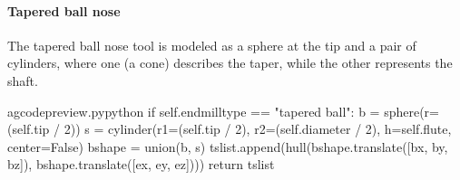 \documentclass{ltxdoc}
\begin{document}
\paragraph{Tapered ball nose}

The tapered ball nose tool is modeled as a sphere at the tip and a pair of cylinders, where one (a cone) describes the taper, while the other represents the shaft.

\lstset{firstnumber=\thegcpy}
\begin{writecode}{a}{gcodepreview.py}{python}
        if self.endmilltype == "tapered ball":
            b = sphere(r=(self.tip / 2))
            s = cylinder(r1=(self.tip / 2), r2=(self.diameter / 2), h=self.flute, center=False)
            bshape = union(b, s)
            tslist.append(hull(bshape.translate([bx, by, bz]), bshape.translate([ex, ey, ez])))
            return tslist

\end{writecode}
\addtocounter{gcpy}{23}

%
%
%

%
%
\end{document}
